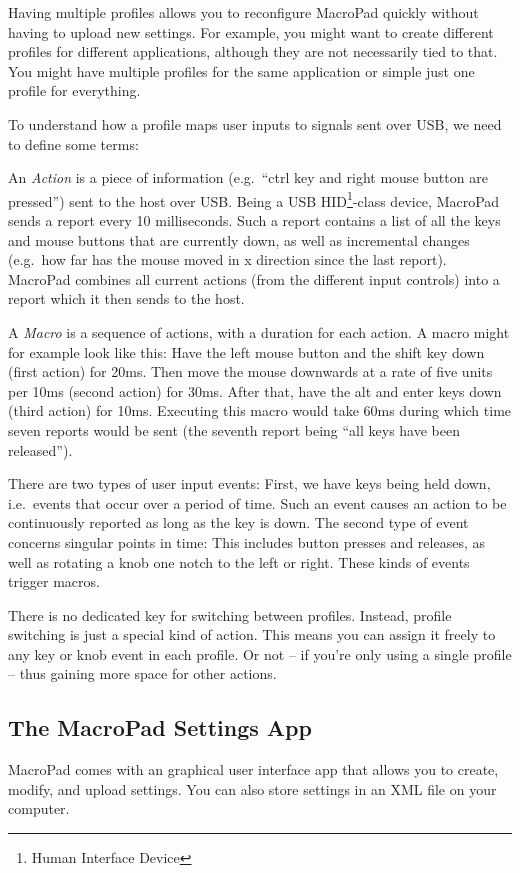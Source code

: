 \documentclass{article}
\begin{document}
Having multiple profiles allows you to reconfigure MacroPad quickly without having to upload new settings. For example, you might want to create different profiles for different applications, although they are not necessarily tied to that. You might have multiple profiles for the same application or simple just one profile for everything.

To understand how a profile maps user inputs to signals sent over USB, we need to define some terms:

An \emph{Action} is a piece of information (e.g.\ ``ctrl key and right mouse button are pressed'') sent to the host over USB. Being a USB HID\footnote{Human Interface Device}-class device, MacroPad sends a report every 10 milliseconds. Such a report contains a list of all the keys and mouse buttons that are currently down, as well as incremental changes (e.g.\ how far has the mouse moved in x direction since the last report). MacroPad combines all current actions (from the different input controls) into a report which it then sends to the host.

A \emph{Macro} is a sequence of actions, with a duration for each action. A macro might for example look like this: Have the left mouse button and the shift key down (first action) for 20ms. Then move the mouse downwards at a rate of five units per 10ms (second action) for 30ms. After that, have the alt and enter keys down (third action) for 10ms.
Executing this macro would take 60ms during which time seven reports would be sent (the seventh report being ``all keys have been released'').

There are two types of user input events: First, we have keys being held down, i.e.\ events that occur over a period of time. Such an event causes an action to be continuously reported as long as the key is down.
The second type of event concerns singular points in time: This includes button presses and releases, as well as rotating a knob one notch to the left or right. These kinds of events trigger macros.

There is no dedicated key for switching between profiles. Instead, profile switching is just a special kind of action. This means you can assign it freely to any key or knob event in each profile. Or not -- if you're only using a single profile -- thus gaining more space for other actions.

\subsection{The MacroPad Settings App}\label{sec:settings_app}
MacroPad comes with an graphical user interface app that allows you to create, modify, and upload settings. You can also store settings in an XML file on your computer.
\end{document}
